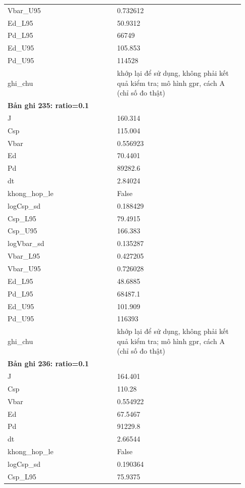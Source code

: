 \begin{longtable}{p{0.43\linewidth}p{0.50\linewidth}}
Vbar\_\allowbreak U95 & 0.732612 \\
Ed\_\allowbreak L95 & 50.9312 \\
Pd\_\allowbreak L95 & 66749 \\
Ed\_\allowbreak U95 & 105.853 \\
Pd\_\allowbreak U95 & 114528 \\
ghi\_\allowbreak chu & khớp lại để sử dụng, không phải kết quả kiểm tra; mô hình gpr, cách A (chỉ số đo thật) \\
\midrule
\multicolumn{2}{p{0.95\linewidth}}{\textbf{Bản ghi 235: ratio=0.1}} \\
J & 160.314 \\
Csp & 115.004 \\
Vbar & 0.556923 \\
Ed & 70.4401 \\
Pd & 89282.6 \\
dt & 2.84024 \\
khong\_\allowbreak hop\_\allowbreak le & False \\
logCsp\_\allowbreak sd & 0.188429 \\
Csp\_\allowbreak L95 & 79.4915 \\
Csp\_\allowbreak U95 & 166.383 \\
logVbar\_\allowbreak sd & 0.135287 \\
Vbar\_\allowbreak L95 & 0.427205 \\
Vbar\_\allowbreak U95 & 0.726028 \\
Ed\_\allowbreak L95 & 48.6885 \\
Pd\_\allowbreak L95 & 68487.1 \\
Ed\_\allowbreak U95 & 101.909 \\
Pd\_\allowbreak U95 & 116393 \\
ghi\_\allowbreak chu & khớp lại để sử dụng, không phải kết quả kiểm tra; mô hình gpr, cách A (chỉ số đo thật) \\
\midrule
\multicolumn{2}{p{0.95\linewidth}}{\textbf{Bản ghi 236: ratio=0.1}} \\
J & 164.401 \\
Csp & 110.28 \\
Vbar & 0.554922 \\
Ed & 67.5467 \\
Pd & 91229.8 \\
dt & 2.66544 \\
khong\_\allowbreak hop\_\allowbreak le & False \\
logCsp\_\allowbreak sd & 0.190364 \\
Csp\_\allowbreak L95 & 75.9375 \\

\end{longtable}
